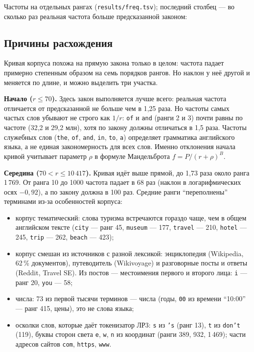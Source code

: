 Частоты на отдельных рангах (\texttt{results/freq.tsv}); последний столбец --- во сколько раз реальная частота больше предсказанной законом:
\begin{center}
\footnotesize

\end{center}

\subsection{Причины расхождения}
Кривая корпуса похожа на прямую закона только в целом: частота падает примерно степенным образом на семь порядков рангов. Но наклон у неё другой и меняется по длине, и можно выделить три участка.

\textbf{Начало ($r \le 70$).} Здесь закон выполняется лучше всего: реальная частота отличается от предсказанной не больше чем в 1,25 раза. Но частоты самых частых слов убывают не строго как $1/r$: \texttt{of} и \texttt{and} (ранги 2 и 3) почти равны по частоте (32,2 и 29,2 млн), хотя по закону должны отличаться в 1,5 раза. Частоты служебных слов (\texttt{the}, \texttt{of}, \texttt{and}, \texttt{in}, \texttt{to}, \texttt{a}) определяет грамматика английского языка, а не единая закономерность для всех слов. Именно отклонения начала кривой учитывает параметр $\rho$ в формуле Мандельброта $f = P / (r + \rho)^B$.

\textbf{Середина ($70 < r \le 10\,417$).} Кривая идёт выше прямой, до 1,73 раза около ранга 1\,769. От ранга 10 до 1000 частота падает в 68 раз (наклон в логарифмических осях $-0{,}92$), а по закону должна в 100 раз. Средние ранги \enquote{переполнены} терминами из-за особенностей корпуса:
\begin{itemize}
    \item корпус тематический: слова туризма встречаются гораздо чаще, чем в общем английском тексте (\texttt{city} --- ранг 45, \texttt{museum} --- 177, \texttt{travel} --- 210, \texttt{hotel} --- 245, \texttt{trip} --- 262, \texttt{beach} --- 423);
    \item корпус смешан из источников с разной лексикой: энциклопедия (Wikipedia, 62\,\% документов), путеводитель (Wikivoyage) и разговорные посты и ответы (Reddit, Travel SE). Из постов --- местоимения первого и второго лица: \texttt{i} --- ранг 20, \texttt{you} --- 58;
    \item числа: 73 из первой тысячи терминов --- числа (годы, \texttt{00} из времени \enquote{10:00} --- ранг 415, цены), это не слова языка;
    \item осколки слов, которые даёт токенизатор ЛР3: \texttt{s} из \texttt{'s} (ранг 13), \texttt{t} из \texttt{don't} (119), буквы сторон света \texttt{e}, \texttt{w}, \texttt{n} из координат (ранги 389, 932, 1\,469); части адресов сайтов \texttt{com}, \texttt{https}, \texttt{www}.
\end{itemize}

